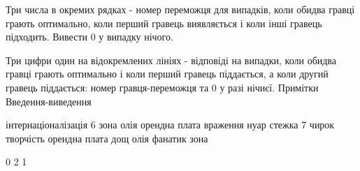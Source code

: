 \documentclass[]{article}
\begin{document}
Три числа в окремих рядках - номер переможця для випадків, коли обидва гравці грають оптимально, коли перший гравець виявляється і коли інші гравець підходить. Вивести 0 у випадку нічого.

Три цифри один на відокремлених лініях - відповіді на випадки, коли обидва гравці грають оптимально і коли перший гравець піддається, а коли другий гравець піддається: номер гравця-переможця та 0 у разі нічиєї.
Примітки
Введення-виведення

інтернаціоналізація
6
зона
олія
орендна плата
враження
нуар
стежка
7
чирок
творчість
орендна плата
дощ
олія
фанатик
зона



0
2
1
\end{document}
